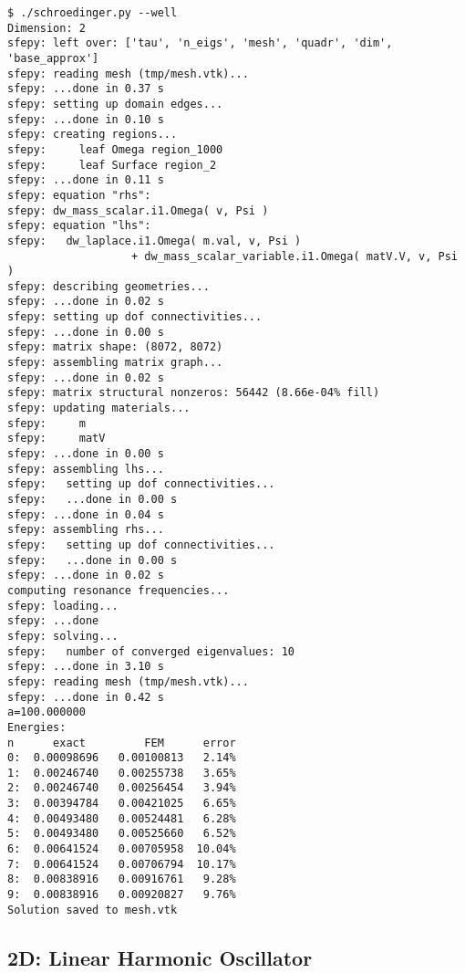 \begin{lstlisting}
$ ./schroedinger.py --well
Dimension: 2
sfepy: left over: ['tau', 'n_eigs', 'mesh', 'quadr', 'dim', 'base_approx']
sfepy: reading mesh (tmp/mesh.vtk)...
sfepy: ...done in 0.37 s
sfepy: setting up domain edges...
sfepy: ...done in 0.10 s
sfepy: creating regions...
sfepy:     leaf Omega region_1000
sfepy:     leaf Surface region_2
sfepy: ...done in 0.11 s
sfepy: equation "rhs":
sfepy: dw_mass_scalar.i1.Omega( v, Psi )
sfepy: equation "lhs":
sfepy:   dw_laplace.i1.Omega( m.val, v, Psi )
                   + dw_mass_scalar_variable.i1.Omega( matV.V, v, Psi )
sfepy: describing geometries...
sfepy: ...done in 0.02 s
sfepy: setting up dof connectivities...
sfepy: ...done in 0.00 s
sfepy: matrix shape: (8072, 8072)
sfepy: assembling matrix graph...
sfepy: ...done in 0.02 s
sfepy: matrix structural nonzeros: 56442 (8.66e-04% fill)
sfepy: updating materials...
sfepy:     m
sfepy:     matV
sfepy: ...done in 0.00 s
sfepy: assembling lhs...
sfepy:   setting up dof connectivities...
sfepy:   ...done in 0.00 s
sfepy: ...done in 0.04 s
sfepy: assembling rhs...
sfepy:   setting up dof connectivities...
sfepy:   ...done in 0.00 s
sfepy: ...done in 0.02 s
computing resonance frequencies...
sfepy: loading...
sfepy: ...done
sfepy: solving...
sfepy:   number of converged eigenvalues: 10
sfepy: ...done in 3.10 s
sfepy: reading mesh (tmp/mesh.vtk)...
sfepy: ...done in 0.42 s
a=100.000000
Energies:
n      exact         FEM      error
0:  0.00098696   0.00100813   2.14%
1:  0.00246740   0.00255738   3.65%
2:  0.00246740   0.00256454   3.94%
3:  0.00394784   0.00421025   6.65%
4:  0.00493480   0.00524481   6.28%
5:  0.00493480   0.00525660   6.52%
6:  0.00641524   0.00705958  10.04%
7:  0.00641524   0.00706794  10.17%
8:  0.00838916   0.00916761   9.28%
9:  0.00838916   0.00920827   9.76%
Solution saved to mesh.vtk
\end{lstlisting}

\subsection{2D: Linear Harmonic Oscillator}


